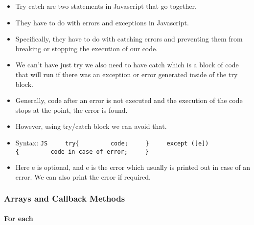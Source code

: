 \documentclass[
  paper=a4,
  ,captions=tableheading
]{scrartcl}
\providecommand{\tightlist}{%
  \setlength{\itemsep}{0pt}\setlength{\parskip}{0pt}}
\begin{document}
\begin{itemize}
\tightlist
\item
  Try catch are two statements in Javascript that go together.
\item
  They have to do with errors and exceptions in Javascript.
\item
  Specifically, they have to do with catching errors and preventing them
  from breaking or stopping the execution of our code.
\item
  We can't have just try we also need to have catch which is a block of
  code that will run if there was an exception or error generated inside
  of the try block.
\item
  Generally, code after an error is not executed and the execution of
  the code stops at the point, the error is found.
\item
  However, using try/catch block we can avoid that.
\item
  Syntax:
  \texttt{JS\ \ \ \ \ try\{\ \ \ \ \ \ \ \ \ code;\ \ \ \ \ \}\ \ \ \ \ except\ ({[}e{]})\{\ \ \ \ \ \ \ \ \ code\ in\ case\ of\ error;\ \ \ \ \ \}}
\item
  Here e is optional, and e is the error which usually is printed out in
  case of an error. We can also print the error if required.
\end{itemize}

\hypertarget{arrays-and-callback-methods}{%
\subsubsection{Arrays and Callback
Methods}\label{arrays-and-callback-methods}}

\hypertarget{for-each}{%
\paragraph{For each}\label{for-each}}
\end{document}
